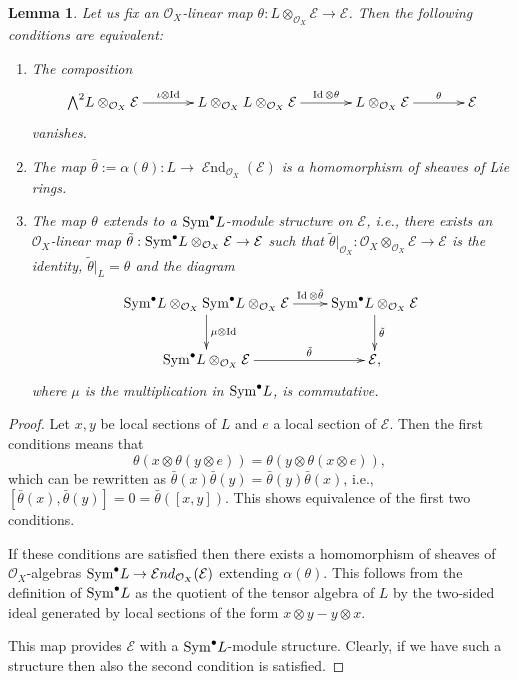 \documentclass[12pt]{article}
\theoremstyle{plain}
\newtheorem{Lemma}[Thm]{\sc Lemma}
\theoremstyle{definition}
\theoremstyle{remark}
\newcommand{\cE}{{\mathcal E}}
\newcommand{\cO}{{\mathcal O}}
\newcommand{\id}{\mathop{\rm Id}}
\newcommand{\End}{{\mathop{{\mathcal E}nd}}}
\newcommand{\Sym}{{\mathop{{\rm Sym}}}}
\begin{document}
\begin{Lemma}\label{equivalent-Higgs}
	Let us fix an $\cO_X$-linear  map $\theta : L\otimes _{\cO_X} \cE\to \cE$.
	Then the following conditions are equivalent:
	\begin{enumerate}
		\item The composition
		$$\xymatrixcolsep{3pc}\xymatrix{
			{\bigwedge}^2L\otimes _{\cO_X}	\cE\ar[r]^-{\iota \otimes \id }& L\otimes _{\cO_X}L\otimes _{\cO_X} \cE \ar[r]^-{\id{\otimes }\theta}&
			L\otimes _{\cO_X}\cE\ar[r]^-{\theta }&
			\cE\\}$$
		vanishes.	
		\item
		The map $\bar\theta:=\alpha (\theta):L\to \End _{\cO_X} (\cE) $ is a homomorphism of sheaves of Lie rings.
		\item The map $\theta$ extends to a $\Sym ^{\bullet}L$-module structure on $\cE$, i.e., there exists an $\cO_X$-linear  map $\tilde\theta : \Sym ^{\bullet} L\otimes _{\cO_X} \cE\to \cE$ such that 
		$\tilde \theta |_{\cO_X}: \cO_X\otimes _{\cO_X} \cE\to \cE$ is the identity, 	$\tilde \theta |_L=\theta$  
		and the diagram
		$$
		\xymatrix{
			\Sym ^{\bullet} L\otimes _{\cO_X} \Sym ^{\bullet} L\otimes _{\cO_X} \cE\ar[r]^-{\id\otimes \tilde\theta}
			\ar[d]^{\mu\otimes \id } &\Sym ^{\bullet} L\otimes _{\cO_X} \cE	\ar[d]^{\tilde\theta} \\
			\Sym ^{\bullet} L\otimes _{\cO_X} \cE\ar[r]^-{\tilde\theta }&\cE,\\
}
		$$
where $\mu$ is the multiplication in $\Sym ^{\bullet} L$, is commutative.
	\end{enumerate}
\end{Lemma}

\begin{proof}
	Let $x,y$ be local sections of $L$ and $e$ a local section of $\cE$.
	Then the first conditions means that
	$$\theta (x\otimes \theta (y\otimes e))=\theta ( y\otimes \theta (x\otimes e)),$$
	which can be rewritten as $\bar\theta (x) \bar\theta (y)= \bar\theta (y)\bar\theta (x)$, i.e.,
	$[\bar\theta (x) ,\bar\theta (y)]=0=\bar \theta ([x,y])$. This shows equivalence of the first two conditions.
	
	If these conditions are satisfied then there exists a homomorphism of sheaves of $\cO_X$-algebras
	$\Sym ^{\bullet}L\to \End _{\cO_X} (\cE)$ extending $\alpha (\theta)$. This follows from the definition of $\Sym ^{\bullet}L$ as the quotient of the tensor algebra of $L$ by the two-sided ideal generated by local sections of the form $x\otimes y-y\otimes x$.
	
	This map provides $\cE$ with  a $\Sym ^{\bullet}L$-module structure. Clearly, if we have such a structure then also the second condition is satisfied.
\end{proof}
\end{document}
